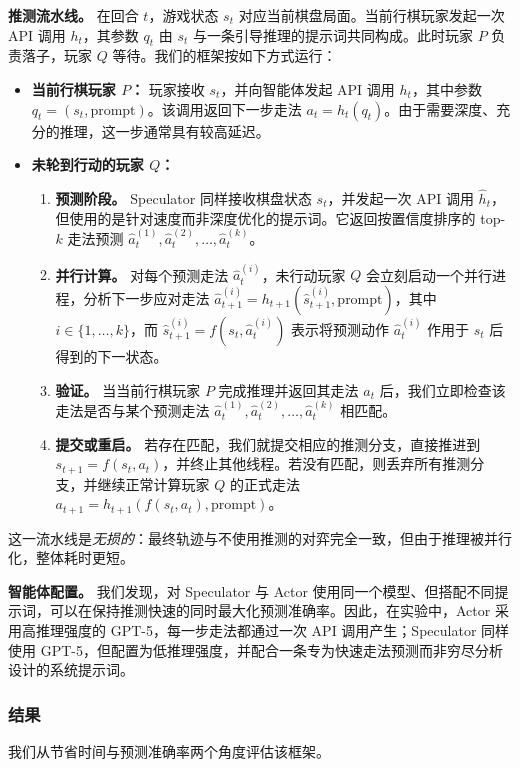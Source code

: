 \textbf{推测流水线。} 在回合 $t$，游戏状态 $s_t$ 对应当前棋盘局面。当前行棋玩家发起一次 API 调用 $h_t$，其参数 $q_t$ 由 $s_t$ 与一条引导推理的提示词共同构成。此时玩家 $P$ 负责落子，玩家 $Q$ 等待。我们的框架按如下方式运行：
\begin{itemize}[leftmargin=*]
    \item \textbf{当前行棋玩家 $P$：} 玩家接收 $s_t$，并向智能体发起 API 调用 $h_t$，其中参数 $q_t = (s_t,\text{prompt})$。该调用返回下一步走法 $a_t = h_t(q_t)$。由于需要深度、充分的推理，这一步通常具有较高延迟。
    \item \textbf{未轮到行动的玩家 $Q$：}
    \begin{enumerate}
        \item \textbf{预测阶段。} Speculator 同样接收棋盘状态 $s_t$，并发起一次 API 调用 $\hat{h}_t$，但使用的是针对速度而非深度优化的提示词。它返回按置信度排序的 top-$k$ 走法预测 $\hat{a}_t^{(1)}, \hat{a}_t^{(2)}, \dots, \hat{a}_t^{(k)}$。
        \item \textbf{并行计算。} 对每个预测走法 $\hat{a}_t^{(i)}$，未行动玩家 $Q$ 会立刻启动一个并行进程，分析下一步应对走法 $\hat{a}_{t+1}^{(i)} = h_{t+1}(\hat{s}_{t+1}^{(i)},\text{prompt})$，其中 $i \in \{1,\ldots,k\}$，而 $\hat{s}_{t+1}^{(i)} = f(s_t,\hat{a}_t^{(i)})$ 表示将预测动作 $\hat{a}_t^{(i)}$ 作用于 $s_t$ 后得到的下一状态。
        \item \textbf{验证。} 当当前行棋玩家 $P$ 完成推理并返回其走法 $a_t$ 后，我们立即检查该走法是否与某个预测走法 $\hat{a}_t^{(1)}, \hat{a}_t^{(2)}, \dots, \hat{a}_t^{(k)}$ 相匹配。
        \item \textbf{提交或重启。} 若存在匹配，我们就提交相应的推测分支，直接推进到 $s_{t+1} = f(s_t, a_t)$，并终止其他线程。若没有匹配，则丢弃所有推测分支，并继续正常计算玩家 $Q$ 的正式走法 $a_{t+1} = h_{t+1}(f(s_t,a_t),\text{prompt})$。
    \end{enumerate}
\end{itemize}

这一流水线是\textit{无损的}：最终轨迹与不使用推测的对弈完全一致，但由于推理被并行化，整体耗时更短。

\textbf{智能体配置。} 我们发现，对 Speculator 与 Actor 使用同一个模型、但搭配不同提示词，可以在保持推测快速的同时最大化预测准确率。因此，在实验中，Actor 采用高推理强度的 GPT-5，每一步走法都通过一次 API 调用产生；Speculator 同样使用 GPT-5，但配置为低推理强度，并配合一条专为快速走法预测而非穷尽分析设计的系统提示词。

\subsubsection{结果}
我们从节省时间与预测准确率两个角度评估该框架。

